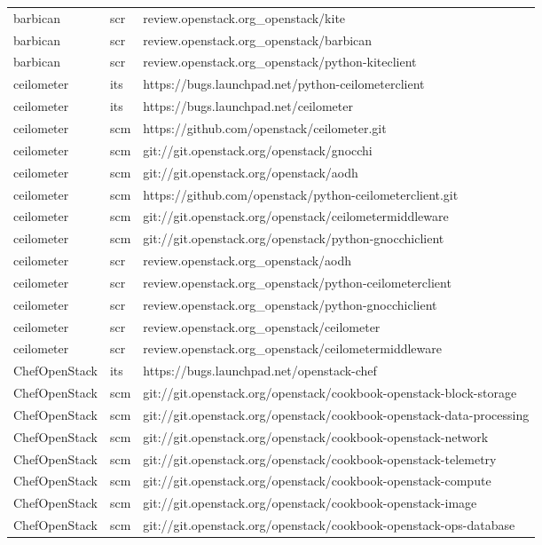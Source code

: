 \begin{center}
\begin{longtable}{|p{4cm}|p{1cm}|p{10cm}|}
barbican&scr&review.openstack.org\_openstack/kite\\ 
barbican&scr&review.openstack.org\_openstack/barbican\\ 
barbican&scr&review.openstack.org\_openstack/python-kiteclient\\ 
ceilometer&its&https://bugs.launchpad.net/python-ceilometerclient\\ 
ceilometer&its&https://bugs.launchpad.net/ceilometer\\ 
ceilometer&scm&https://github.com/openstack/ceilometer.git\\ 
ceilometer&scm&git://git.openstack.org/openstack/gnocchi\\ 
ceilometer&scm&git://git.openstack.org/openstack/aodh\\ 
ceilometer&scm&https://github.com/openstack/python-ceilometerclient.git\\ 
ceilometer&scm&git://git.openstack.org/openstack/ceilometermiddleware\\ 
ceilometer&scm&git://git.openstack.org/openstack/python-gnocchiclient\\ 
ceilometer&scr&review.openstack.org\_openstack/aodh\\ 
ceilometer&scr&review.openstack.org\_openstack/python-ceilometerclient\\ 
ceilometer&scr&review.openstack.org\_openstack/python-gnocchiclient\\ 
ceilometer&scr&review.openstack.org\_openstack/ceilometer\\ 
ceilometer&scr&review.openstack.org\_openstack/ceilometermiddleware\\ 
ChefOpenStack&its&https://bugs.launchpad.net/openstack-chef\\ 
ChefOpenStack&scm&git://git.openstack.org/openstack/cookbook-openstack-block-storage\\ 
ChefOpenStack&scm&git://git.openstack.org/openstack/cookbook-openstack-data-processing\\ 
ChefOpenStack&scm&git://git.openstack.org/openstack/cookbook-openstack-network\\ 
ChefOpenStack&scm&git://git.openstack.org/openstack/cookbook-openstack-telemetry\\ 
ChefOpenStack&scm&git://git.openstack.org/openstack/cookbook-openstack-compute\\ 
ChefOpenStack&scm&git://git.openstack.org/openstack/cookbook-openstack-image\\ 
ChefOpenStack&scm&git://git.openstack.org/openstack/cookbook-openstack-ops-database\\ 

\end{longtable}
\end{center}
